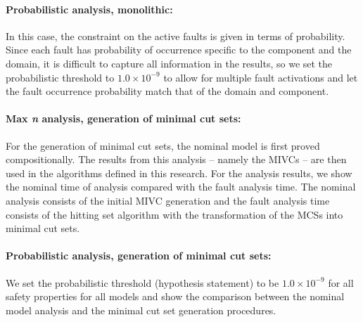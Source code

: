 
\paragraph{Probabilistic analysis, monolithic:} In this case, the constraint on the active faults is given in terms of probability. Since each fault has probability of occurrence specific to the component and the domain, it is difficult to capture all information in the results, so we set the probabilistic threshold to $1.0 \times 10^{-9}$ to allow for multiple fault activations and let the fault occurrence probability match that of the domain and component. 


\paragraph{Max \textit{n} analysis, generation of minimal cut sets:} For the generation of minimal cut sets, the nominal model is first proved compositionally. The results from this analysis -- namely the MIVCs -- are then used in the algorithms defined in this research. For the analysis results, we show the nominal time of analysis compared with the fault analysis time. The nominal analysis consists of the initial MIVC generation and the fault analysis time consists of the hitting set algorithm with the transformation of the MCSs into minimal cut sets. 


\paragraph{Probabilistic analysis, generation of minimal cut sets:} We set the probabilistic threshold (hypothesis statement) to be $1.0 \times 10^{-9}$ for all safety properties for all models and show the comparison between the nominal model analysis and the minimal cut set generation procedures. 


